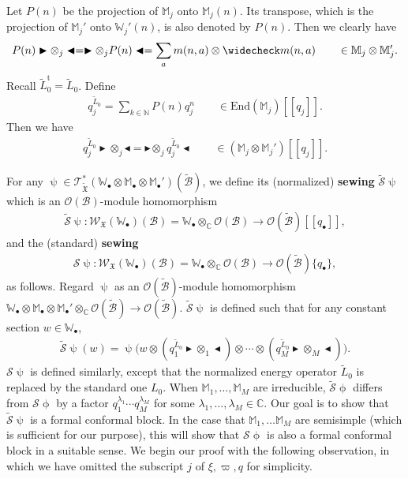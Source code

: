 \documentclass[12pt,a4paper,notitlepage]{report}
\theoremstyle{definition}
\theoremstyle{plain}
\newcommand{\fk}{\mathfrak}
\newcommand{\mc}{\mathcal}
\newcommand{\wtd}{\widetilde}
\newcommand{\wch}{\widecheck}
\newcommand{\tr}{\mathrm{t}} %
\newcommand{\End}{\mathrm{End}} %
\newcommand{\scr}{\mathscr}
\newcommand{\blt}{\bullet}
\newcommand{\Wbb}{\mathbb W}
\newcommand{\Mbb}{\mathbb M}
\newcommand{\Cbb}{\mathbb C}
\newcommand{\Nbb}{\mathbb N}
\newcommand{\btl}{\blacktriangleleft}
\newcommand{\btr}{\blacktriangleright}
\numberwithin{equation}{section}
\begin{document}
Let $P(n)$ be the projection of $\Mbb_j$ onto $\Mbb_j(n)$. Its transpose, which is the projection of $\Mbb_j'$ onto $\Wbb_j'(n)$, is also denoted by $P(n)$. Then we clearly have
\begin{align*}
P(n)\btr\otimes_j\btl=\btr\otimes_j P(n)\btl=\sum_am(n,a)\otimes\wch m(n,a)\qquad\in\Mbb_j\otimes\Mbb_j'.
\end{align*}
Recall $\wtd L_0^\tr=\wtd L_0$. Define
\begin{align}
q_j^{\wtd L_0}=\sum_{k\in\Nbb}P(n)q_j^n\qquad\in\End(\Mbb_j)[[q_j]].
\end{align} 
Then we have
\begin{align}
q_j^{\wtd L_0}\btr\otimes_j\btl=\btr\otimes_j q_j^{\wtd L_0} \btl\qquad \in (\Mbb_j\otimes\Mbb_j')[[q_j]].\label{eq109}
\end{align}

For any $\uppsi\in\scr T_{\wtd{\fk X}}^*(\Wbb_\blt\otimes\Mbb_\blt\otimes\Mbb_\blt')(\wtd{\mc B})$, we define its (normalized) \textbf{sewing} $\wtd{\mc S}\uppsi$ which is an $\scr O(\mc B)$-module homomorphism \index{S@$\wtd{\mc S}\uppsi,\mc S\uppsi$}
\begin{align*}
\wtd{\mc S}\uppsi:\scr W_{\fk X}(\Wbb_\blt)(\mc B)=\Wbb_\blt\otimes_\Cbb\scr O(\mc B)\rightarrow\scr O(\wtd{\mc B})[[q_\blt]],
\end{align*}
and the (standard) \textbf{sewing}
\begin{align*}
\mc S\uppsi:\scr W_{\fk X}(\Wbb_\blt)(\mc B)=\Wbb_\blt\otimes_\Cbb\scr O(\mc B)\rightarrow\scr O(\wtd{\mc B})\{q_\blt\},
\end{align*}
as follows. Regard $\uppsi$ as an $\scr O(\wtd{\mc B})$-module homomorphism $\Wbb_\blt\otimes\Mbb_\blt\otimes\Mbb_\blt'\otimes_\Cbb\scr O(\wtd{\mc B})\rightarrow \scr O(\wtd{\mc B})$. $\wtd{\mc S}\uppsi$ is defined such that for any constant section $w\in\Wbb_\blt$,
\begin{align}
\wtd{\mc S}\uppsi(w)=\uppsi\Big(w\otimes (q_1^{\wtd L_0}\btr\otimes_1\btl)\otimes\cdots\otimes (q_M^{\wtd L_0}\btr\otimes_M\btl)\Big).
\end{align}
$\mc S\uppsi$ is defined similarly, except that the normalized energy operator $\wtd L_0$ is replaced by the standard one $L_0$. When $\Mbb_1,\dots,\Mbb_M$ are irreducible, $\wtd{\mc S}\upphi$ differs from $\mc S\upphi$ by a factor $q_1^{\lambda_1}\cdots q_M^{\lambda_M}$ for some $\lambda_1,\dots,\lambda_M\in\Cbb$. Our goal is to show that $\wtd{\mc S}\uppsi$ is a formal conformal block. In the case that $\Mbb_1,\dots \Mbb_M$ are semisimple (which is sufficient for our purpose), this will show that $\mc S\upphi$ is also a formal conformal block in a suitable sense. We begin our proof with the following observation, in which we have omitted the subscript $j$ of $\xi,\varpi,q$ for simplicity.
\end{document}
